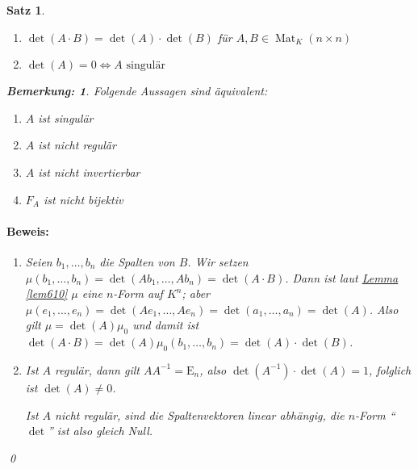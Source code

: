 \documentclass{report}
\DeclareMathOperator{\Mat}{Mat}
\newcommand{\En}{\mathrm{E}_n}
\theoremstyle{customrem}
\newtheorem*{bemerkung}{Bemerkung\textnormal:}
\theoremstyle{customdef}
\newtheorem{satz}[definition]{Satz}
\renewenvironment{proof}{\paragraph{Beweis: }}{\qed}
\theoremstyle{customenv}
\begin{document}
	\begin{satz}\( \)\vspace{-.5cm} %
		\begin{enumerate}
			\item \(\det(A\cdot B) = \det(A)\cdot\det(B)\) für \(A,B\in\Mat_K(n\times n)\)
			\item \(\det(A) = 0\iff A\text{ singulär}\)
		\end{enumerate}
		\begin{bemerkung}
			Folgende Aussagen sind äquivalent:
			\begin{enumerate}[leftmargin=6cm]
				\item \(A\) ist singulär
				\item \(A\) ist nicht regulär
				\item \(A\) ist nicht invertierbar
				\item \(F_A\) ist nicht bijektiv
			\end{enumerate}
		\end{bemerkung}
		\begin{proof}
			\begin{enumerate}
				\item Seien \(b_1,\ldots, b_n\) die Spalten von \(B\). Wir setzen \(\mu(b_1,\ldots, b_n) = \det(Ab_1,\ldots, Ab_n) = \det(A\cdot B)\). Dann ist laut \hyperref[lem610]{Lemma \ref*{lem610}} \(\mu\) eine \(n\)-Form auf \(K^n\); aber \(\mu(e_1,\ldots, e_n) = \det(Ae_1,\ldots, Ae_n) = \det(a_1,\ldots, a_n) = \det(A)\). Also gilt \(\mu=\det(A)\mu_0\) und damit ist \(\det(A\cdot B) = \det(A)\mu_0(b_1,\ldots, b_n)=\det(A)\cdot\det(B)\).
				\item Ist \(A\) regulär, dann gilt \(AA^{-1}=\En\), also \(\det(A^{-1})\cdot\det(A)=1\), folglich ist \(\det(A)\neq 0\).

				Ist \(A\) nicht regulär, sind die Spaltenvektoren linear abhängig, die \(n\)-Form "`\(\det\)"' ist also gleich Null.
			\end{enumerate}
		\end{proof}
	\end{satz}
\end{document}
